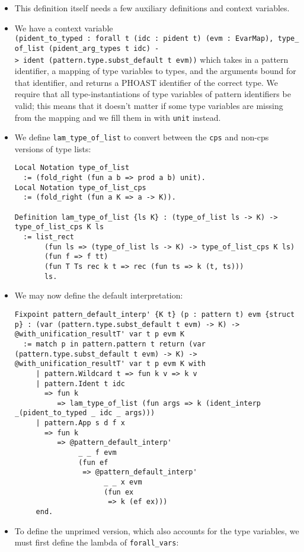 \documentclass[
]{article}
\begin{document}
\begin{itemize}
\begin{itemize}
\begin{itemize}
\begin{itemize}
\begin{itemize}
\begin{itemize}
            \begin{itemize}
            \item
              This definition itself needs a few auxiliary definitions
              and context variables.
            \item
              We have a context variable
              \texttt{(pident\_to\_typed\ :\ forall\ t\ (idc\ :\ pident\ t)\ (evm\ :\ EvarMap),\ type\_of\_list\ (pident\_arg\_types\ t\ idc)\ -\textgreater{}\ ident\ (pattern.type.subst\_default\ t\ evm))}
              which takes in a pattern identifier, a mapping of type
              variables to types, and the arguments bound for that
              identifier, and returns a PHOAST identifier of the correct
              type. We require that all type-instantiations of type
              variables of pattern identifiers be valid; this means that
              it doesn't matter if some type variables are missing from
              the mapping and we fill them in with \texttt{unit}
              instead.
            \item
              We define \texttt{lam\_type\_of\_list} to convert between
              the \texttt{cps} and non-cps versions of type lists:

\begin{verbatim}
Local Notation type_of_list
  := (fold_right (fun a b => prod a b) unit).
Local Notation type_of_list_cps
  := (fold_right (fun a K => a -> K)).

Definition lam_type_of_list {ls K} : (type_of_list ls -> K) -> type_of_list_cps K ls
  := list_rect
       (fun ls => (type_of_list ls -> K) -> type_of_list_cps K ls)
       (fun f => f tt)
       (fun T Ts rec k t => rec (fun ts => k (t, ts)))
       ls.
\end{verbatim}
            \item
              We may now define the default interpretation:

\begin{verbatim}
Fixpoint pattern_default_interp' {K t} (p : pattern t) evm {struct p} : (var (pattern.type.subst_default t evm) -> K) -> @with_unification_resultT' var t p evm K
  := match p in pattern.pattern t return (var (pattern.type.subst_default t evm) -> K) -> @with_unification_resultT' var t p evm K with
     | pattern.Wildcard t => fun k v => k v
     | pattern.Ident t idc
       => fun k
          => lam_type_of_list (fun args => k (ident_interp _(pident_to_typed _ idc _ args)))
     | pattern.App s d f x
       => fun k
          => @pattern_default_interp'
               _ _ f evm
               (fun ef
                => @pattern_default_interp'
                     _ _ x evm
                     (fun ex
                      => k (ef ex)))
     end.
\end{verbatim}
            \item
              To define the unprimed version, which also accounts for
              the type variables, we must first define the lambda of
              \texttt{forall\_vars}:


\end{itemize}
\end{itemize}
\end{itemize}
\end{itemize}
\end{itemize}
\end{itemize}
\end{itemize}
\end{document}
